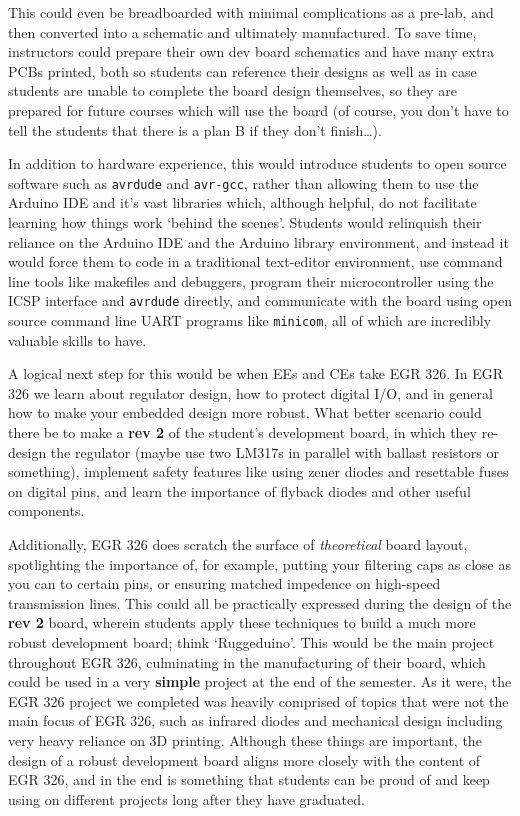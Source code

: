 \documentclass[12pt]{article}
\numberwithin{figure}{section}
\numberwithin{equation}{section}
\begin{document}
{This could even be breadboarded with minimal complications as a pre-lab,
and then converted into a schematic and ultimately manufactured. To save
time, instructors could prepare their own dev board schematics and have
many extra PCBs printed, both so students can reference their designs as
well as in case students are unable to complete the board design
themselves, so they are prepared for future courses which will use the
board (of course, you don't have to tell the students that there is a
plan B if they don't finish\ldots{}).

\bigskip

In addition to hardware experience, this would introduce students to
open source software such as \texttt{avrdude} and \texttt{avr-gcc},
rather than allowing them to use the Arduino IDE and it's vast libraries
which, although helpful, do not facilitate learning how things work
`behind the scenes'. Students would relinquish their reliance on the
Arduino IDE and the Arduino library environment, and instead it would
force them to code in a traditional text-editor environment, use command
line tools like makefiles and debuggers, program their microcontroller
using the ICSP interface and \texttt{avrdude} directly, and communicate
with the board using open source command line UART programs like
\texttt{minicom}, all of which are incredibly valuable skills to have.

\bigskip

A logical next step for this would be when EEs and CEs take EGR 326. In
EGR 326 we learn about regulator design, how to protect digital I/O, and
in general how to make your embedded design more robust. What better
scenario could there be to make a \textbf{rev 2} of the student's
development board, in which they re-design the regulator (maybe use two
LM317s in parallel with ballast resistors or something), implement
safety features like using zener diodes and resettable fuses on digital
pins, and learn the importance of flyback diodes and other useful
components.

\bigskip

Additionally, EGR 326 does scratch the surface of \emph{theoretical}
board layout, spotlighting the importance of, for example, putting your
filtering caps as close as you can to certain pins, or ensuring matched
impedence on high-speed transmission lines. This could all be
practically expressed during the design of the \textbf{rev 2} board,
wherein students apply these techniques to build a much more robust
development board; think `Ruggeduino'. This would be the main project
throughout EGR 326, culminating in the manufacturing of their board,
which could be used in a very \textbf{simple} project at the end of the
semester. As it were, the EGR 326 project we completed was heavily
comprised of topics that were not the main focus of EGR 326, such as
infrared diodes and mechanical design including very heavy reliance on
3D printing. Although these things are important, the design of a robust
development board aligns more closely with the content of EGR 326, and
in the end is something that students can be proud of and keep using on
different projects long after they have graduated.

}
\end{document}
